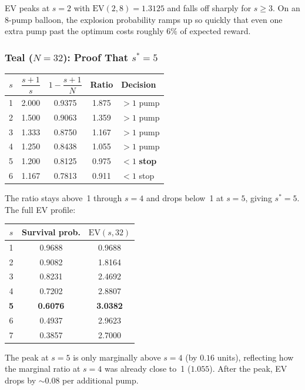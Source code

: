 \documentclass[11pt,a4paper]{article}
\begin{document}
EV peaks at $s = 2$ with $\text{EV}(2,8) = 1.3125$ and falls off sharply
for $s \ge 3$. On an 8-pump balloon, the explosion probability ramps up so
quickly that even one extra pump past the optimum costs roughly $6\%$ of
expected reward.

\subsubsection*{Teal ($N = 32$): Proof That $s^* = 5$}

\begin{center}
\begin{tabular}{@{}ccccl@{}}
\toprule
$s$ & $\dfrac{s+1}{s}$ & $1 - \dfrac{s+1}{N}$ & Ratio & Decision \\[4pt]
\midrule
1 & 2.000 & 0.9375 & 1.875 & $> 1$ \;\;pump \\[2pt]
2 & 1.500 & 0.9063 & 1.359 & $> 1$ \;\;pump \\[2pt]
3 & 1.333 & 0.8750 & 1.167 & $> 1$ \;\;pump \\[2pt]
4 & 1.250 & 0.8438 & 1.055 & $> 1$ \;\;pump \\[2pt]
5 & 1.200 & 0.8125 & 0.975 & $< 1$ \;\;\textbf{stop} \\[2pt]
6 & 1.167 & 0.7813 & 0.911 & $< 1$ \;\;stop \\
\bottomrule
\end{tabular}
\end{center}

The ratio stays above~1 through $s = 4$ and drops below~1 at $s = 5$,
giving $s^* = 5$. The full EV profile:

\begin{center}
\begin{tabular}{@{}ccc@{}}
\toprule
$s$ & Survival prob. & $\text{EV}(s, 32)$ \\
\midrule
1 & 0.9688 & 0.9688 \\
2 & 0.9082 & 1.8164 \\
3 & 0.8231 & 2.4692 \\
4 & 0.7202 & 2.8807 \\
\textbf{5} & \textbf{0.6076} & \textbf{3.0382} \\
6 & 0.4937 & 2.9623 \\
7 & 0.3857 & 2.7000 \\
\bottomrule
\end{tabular}
\end{center}

The peak at $s = 5$ is only marginally above $s = 4$ (by $0.16$ units),
reflecting how the marginal ratio at $s = 4$ was already close to~1 ($1.055$).
After the peak, EV drops by ${\sim}0.08$ per additional pump.
\end{document}
